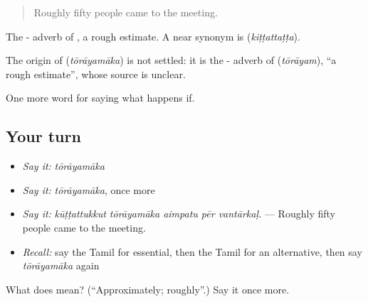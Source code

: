 \begin{quote}
Roughly fifty people came to the meeting.
\end{quote}

The - adverb of , a rough estimate. A near synonym is  (\emph{kiṭṭattaṭṭa}).

\begin{cousinweb}
The origin of \textbf{} (\emph{tōrāyamāka}) is not settled: it is the - adverb of  (\emph{tōrāyam}), \textquotedblleft{}a rough estimate\textquotedblright{}, whose source is unclear.
\end{cousinweb}

\begin{grammarlens}[title={What you've built}]
One more word for saying what happens if.
\end{grammarlens}

\subsection*{Your turn}
\begin{itemize}
\raggedright
  \item \emph{Say it:} \emph{tōrāyamāka}
  \item \emph{Say it:} \emph{tōrāyamāka}, once more
  \item \emph{Say it:} \emph{kūṭṭattukkut tōrāyamāka aimpatu pēr vantārkaḷ.} — Roughly fifty people came to the meeting.
  \item \emph{Recall:} say the Tamil for essential, then the Tamil for an alternative, then say \emph{tōrāyamāka} again
\end{itemize}

\begin{tcolorbox}[breakable,colback=teal!4,colframe=teal!35!black,title={Before you move on}]
What does  mean? (\textquotedblleft{}Approximately; roughly\textquotedblright{}.) Say it once more.
\end{tcolorbox}
